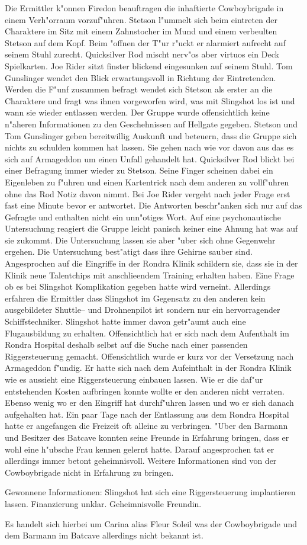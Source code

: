 
Die Ermittler k"onnen Firedon beauftragen die inhaftierte Cowboybrigade in einem Verh"orraum vorzuf"uhren. Stetson l"ummelt sich beim eintreten der Charaktere im Sitz mit einem Zahnstocher im Mund und einem verbeulten Stetson auf dem Kopf. Beim "offnen der T"ur r"uckt er alarmiert aufrecht auf seinem Stuhl zurecht. Quicksilver Rod mischt nerv"os aber virtuos ein Deck Spielkarten. Joe Rider sitzt finster blickend eingesunken auf seinem Stuhl. Tom Gunslinger wendet den Blick erwartungsvoll in Richtung der Eintretenden. Werden die F"unf zusammen befragt wendet sich Stetson als erster an die Charaktere und fragt was ihnen vorgeworfen wird, was mit Slingshot los ist und wann sie wieder entlassen werden. Der Gruppe wurde offensichtlich keine n"aheren Informationen zu den Geschehnissen auf Hellgate gegeben. Stetson und Tom Gunslinger geben bereitwillig Auskunft und beteuern, dass die Gruppe sich nichts zu schulden kommen hat lassen. Sie gehen nach wie vor davon aus das es sich auf Armageddon um einen Unfall gehandelt hat. Quicksilver Rod blickt bei einer Befragung immer wieder zu Stetson. Seine Finger scheinen dabei ein Eigenleben zu f"uhren und einen Kartentrick nach dem anderen zu vollf"uhren ohne das Rod Notiz davon nimmt. Bei Joe Rider vergeht nach jeder Frage erst fast eine Minute bevor er antwortet. Die Antworten beschr"anken sich nur auf das Gefragte und enthalten nicht ein unn"otiges Wort. Auf eine psychonautische Untersuchung reagiert die Gruppe leicht panisch keiner eine Ahnung hat was auf sie zukommt. Die Untersuchung lassen sie aber "uber sich ohne Gegenwehr ergehen. Die Untersuchung best"atigt dass ihre Gehirne sauber sind. Angesprochen auf die Eingriffe in der Rondra Klinik schildern sie, dass sie in der Klinik neue Talentchips mit anschlie\3endem Training erhalten haben. Eine Frage ob es bei Slingshot Komplikation gegeben hatte wird verneint. Allerdings erfahren die Ermittler dass Slingshot im Gegensatz zu den anderen kein ausgebildeter Shuttle-- und Drohnenpilot ist sondern nur ein hervorragender Schiffstechniker. Slingshot hatte immer davon getr"aumt auch eine Flugausbildung zu erhalten. Offensichtlich hat er sich nach dem Aufenthalt im Rondra Hospital deshalb selbst auf die Suche nach einer passenden Riggersteuerung gemacht. Offensichtlich wurde er kurz vor der Versetzung nach Armageddon f"undig. Er hatte sich nach dem Aufeinthalt in der Rondra Klinik wie es aussieht eine Riggersteuerung einbauen lassen. Wie er die daf"ur entstehenden Kosten aufbringen konnte wollte er den anderen nicht verraten. Ebenso wenig wo er den Eingriff hat durchf"uhren lassen und wo er sich danach aufgehalten hat. Ein paar Tage nach der Entlassung aus dem Rondra Hospital hatte er angefangen die Freizeit oft alleine zu verbringen. "Uber den Barmann und Besitzer des Batcave konnten seine Freunde in Erfahrung bringen, dass er wohl eine h"ubsche Frau kennen gelernt hatte. Darauf angesprochen tat er allerdings immer betont geheimnisvoll. Weitere Informationen sind von der Cowboybrigade  nicht in Erfahrung zu bringen.

\begin{remarks}
	Gewonnene Informationen: Slingshot hat sich eine Riggersteuerung implantieren lassen. Finanzierung unklar. Geheimnisvolle Freundin. 
	
	Es handelt sich hierbei um Carina alias Fleur Soleil was der Cowboybrigade und dem Barmann im Batcave allerdings nicht bekannt ist.
\end{remarks}
